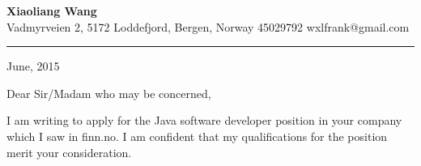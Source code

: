 \documentclass[12pt,letterpaper]{article}
\begin{document}

\begin{center}
    {\color{shade}\LARGE \textbf{Xiaoliang Wang}}\\
    \vspace{0.4em}
    Vadmyrveien 2, 5172 Loddefjord, Bergen, Norway \quad {\color{shade}\Large\Mobilefone} 45029792 \quad {\color{shade}\Large\Letter} wxlfrank@gmail.com
    \vspace{-0.8em}
\end{center}

\hrule
\vspace{5em}

\noindent 
June, 2015
\vspace{5em}

\noindent
Dear Sir/Madam who may be concerned,

I am writing to apply for the Java software developer position in your company which I saw in finn.no.
I am confident that my qualifications for the position merit your consideration.
\end{document}
